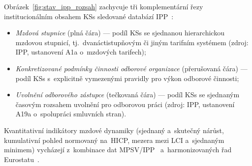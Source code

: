 Obrázek~\ref{fig:stav_ipp_rozsah} zachycuje tři komplementární řezy institucionálním obsahem \acsp{KS} sledované databází \acs{IPP}~\cite{mpsv_ipp}:
\begin{itemize}[noitemsep]
  \item \emph{Mzdová stupnice} (plná čára) --- podíl \acsp{KS} se sjednanou hierarchickou mzdovou stupnicí, tj.\ dvanáctistupňovým či jiným tarifním systémem (zdroj: \acs{IPP}, ustanovení A1a o~mzdových tarifech);
  \item \emph{Konkretizované podmínky činnosti odborové organizace} (přerušovaná čára) --- podíl \acsp{KS} s~explicitně vymezenými pravidly pro výkon odborové činnosti;
  \item \emph{Uvolnění odborového zástupce} (tečkovaná čára) --- podíl \acsp{KS} se sjednaným časovým rozsahem uvolnění pro odborovou práci (zdroj: \acs{IPP}, ustanovení A19a o~spolupráci smluvních stran).
\end{itemize}
Kvantitativní indikátory mzdové dynamiky (sjednaný a~skutečný nárůst, kumulativní pohled normovaný na~\acs{HICP}, mezera mezi \acs{LCI} a~sjednaným minimem) vycházejí z~kombinace dat \acs{MPSV}/\acs{IPP}~\cite{mpsv_ipp} a~harmonizovaných řad Eurostatu~\cite{eurostat_lci,eurostat_hicp}.






